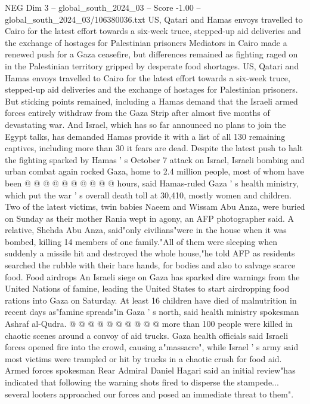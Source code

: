 \begin{textsample}{NEG Dim 3 – global\_south\_2024\_03 – Score -1.00 – global\_south\_2024\_03/106380036.txt}  \label{ex:f3_neg_044}
US, Qatari and Hamas envoys travelled to Cairo for the latest effort towards a six-week truce, stepped-up aid deliveries and the exchange of hostages for Palestinian prisoners Mediators in Cairo made a renewed push for a Gaza ceasefire, but differences remained as fighting raged on in the Palestinian territory gripped by desperate food shortages.
US, Qatari and Hamas envoys travelled to Cairo for the latest effort towards a six-week truce, stepped-up aid deliveries and the exchange of hostages for Palestinian prisoners.
But sticking points remained, including a Hamas demand that the Israeli armed forces entirely withdraw from the Gaza Strip after almost five months of devastating war.
And Israel, which has so far announced no plans to join the Egypt talks, has demanded Hamas provide it with a list of all 130 remaining captives, including more than 30 it fears are dead.
Despite the latest push to halt the fighting sparked by Hamas ' s October 7 attack on Israel, Israeli bombing and urban combat again rocked Gaza, home to 2.4 million people, most of whom have been @ @ @ @ @ @ @ @ @ @ hours, said Hamas-ruled Gaza ' s health ministry, which put the war ' s overall death toll at 30,410, mostly women and children.
Two of the latest victims, twin babies Naeem and Wissam Abu Anza, were buried on Sunday as their mother Rania wept in agony, an AFP photographer said.
A relative, Shehda Abu Anza, said"only civilians"were in the house when it was bombed, killing 14 members of one family."All of them were sleeping when suddenly a missile hit and destroyed the whole house,"he told AFP as residents searched the rubble with their bare hands, for bodies and also to salvage scarce food.
Food airdrops An Israeli siege on Gaza has sparked dire warnings from the United Nations of famine, leading the United States to start airdropping food rations into Gaza on Saturday.
At least 16 children have died of malnutrition in recent days as"famine spreads"in Gaza ' s north, said health ministry spokesman Ashraf al-Qudra. @ @ @ @ @ @ @ @ @ @ more than 100 people were killed in chaotic scenes around a convoy of aid trucks.
Gaza health officials said Israeli forces opened fire into the crowd, causing a"massacre", while Israel ' s army said most victims were trampled or hit by trucks in a chaotic crush for food aid.
Armed forces spokesman Rear Admiral Daniel Hagari said an initial review"has indicated that following the warning shots fired to disperse the stampede... several looters approached our forces and posed an immediate threat to them".

\end{textsample}
